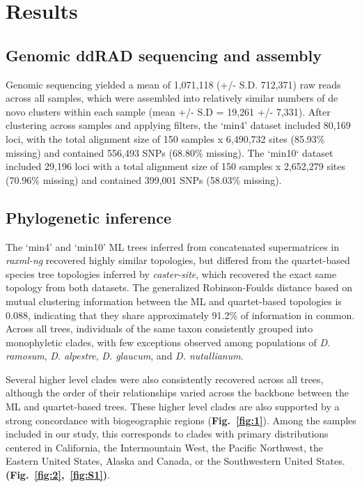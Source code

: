 \documentclass[11pt]{article}
\begin{document}
\section{Results}
\subsection{Genomic ddRAD sequencing and assembly}
Genomic sequencing yielded a mean of 1,071,118 (+/- S.D. 712,371) raw reads 
across all samples, which were assembled into relatively similar numbers of 
de novo clusters within each sample (mean +/- S.D = 19,261 +/- 7,331). 
% 
After clustering across samples and applying filters, the `min4’ dataset 
included 80,169 loci, with the total alignment size of 150 samples x 
6,490,732 sites (85.93\% missing) and contained 556,493 SNPs (68.80\% missing). 
The `min10` dataset included 29,196 loci with a total alignment size of 
150 samples x 2,652,279 sites (70.96\% missing) and contained 399,001 SNPs
(58.03\% missing).


\subsection{Phylogenetic inference}
The ‘min4’ and ‘min10’ ML trees inferred from concatenated supermatrices in
\emph{raxml-ng} recovered highly similar topologies, but differed from the quartet-based
species tree topologies inferred by \emph{caster-site}, which recovered the exact
same topology from both datasets. The generalized Robinson-Foulds distance based 
on mutual clustering information \citep[MCI;][]{smith_2020} between the ML and 
quartet-based topologies is 0.088, indicating that they share approximately 
91.2\% of information in common. 
% 
Across all trees, individuals of the same taxon consistently grouped into 
monophyletic clades, with few exceptions observed among populations of 
\emph{D. ramosum}, \emph{D. alpestre}, \emph{D. glaucum}, and \emph{D. nutallianum}.
% 



Several higher level clades were also consistently recovered across all 
trees, although the order of their relationships varied across the backbone 
between the ML and quartet-based trees.
% 
These higher level clades are also supported by a strong concordance with 
biogeographic regions ({\bf Fig.~\ref{fig:1}}). Among the samples included in
our study, this corresponds to clades with primary distributions centered
in California, the Intermountain West, the Pacific Northwest, the Eastern United
States, Alaska and Canada, or the Southwestern United States.
{\bf(Fig.~\ref{fig:2},~\ref{fig:S1})}. 
\end{document}
